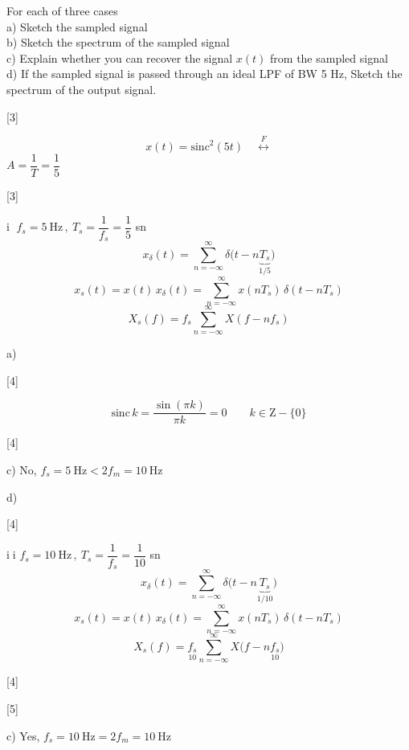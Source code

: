\documentclass[11pt,a4paper]{article}
\begin{document}
\noindent For each of three cases\\
a) Sketch the sampled signal\\
b) Sketch the spectrum of the sampled signal\\
c) Explain whether you can recover the signal $x(t)$ from the sampled signal\\
d) If the sampled signal is passed through an ideal LPF of BW 5 Hz, Sketch the spectrum of the output signal.

[3]


\[ x(t)=\mathrm{sinc}^2(5t)\quad\overset{F}{\longleftrightarrow} \]
\noindent $A=\dfrac{1}{T}=\dfrac{1}{5}$

[3]

\noindent \textcircled{\small i} \quad $f_s=5\ \mathrm{Hz}\,,\ T_s=\dfrac{1}{f_s}=\dfrac{1}{5}$ sn
\[ x_\delta(t)=\sum_{n=-\infty}^{\infty}\delta\bigl(t-n\underbrace{T_s}_{1/5}\bigr) \]
\[ x_s(t)=x(t)\,x_\delta(t)=\sum_{n=-\infty}^{\infty}x(nT_s)\,\delta(t-nT_s) \]
\[ X_s(f)=f_s\sum_{n=-\infty}^{\infty}X(f-nf_s) \]

\noindent a)

[4]

\[ \mathrm{sinc}\,k=\frac{\sin(\pi k)}{\pi k}=0 \qquad k\in \mathrm{Z}-\{0\} \]

[4]

\noindent c) No, $f_s=5\ \mathrm{Hz}<2f_m=10\ \mathrm{Hz}$

\noindent d)

[4]

\noindent \textcircled{\small ii} \quad $f_s=10\ \mathrm{Hz}\,,\ T_s=\dfrac{1}{f_s}=\dfrac{1}{10}$ sn
\[ x_\delta(t)=\sum_{n=-\infty}^{\infty}\delta\bigl(t-n\underbrace{T_s}_{1/10}\bigr) \]
\[ x_s(t)=x(t)\,x_\delta(t)=\sum_{n=-\infty}^{\infty}x(nT_s)\,\delta(t-nT_s) \]
\[ X_s(f)=\underset{10}{f_s}\sum_{n=-\infty}^{\infty}X\bigl(f-n\underset{10}{f_s}\bigr) \]

[4]

[5]

\noindent c) Yes, $f_s=10\ \mathrm{Hz}=2f_m=10\ \mathrm{Hz}$
\end{document}
